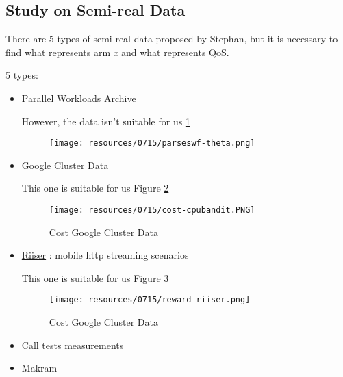 \subsection*{Study on Semi-real Data}
There are 5 types of semi-real data proposed by Stephan, but it is necessary to find what represents arm \textit{x} and what represents QoS.

5 types:
\begin{itemize}
	\item \href{http://www.cs.huji.ac.il/labs/parallel/workload/swf.html}{Parallel Workloads Archive} 
	
	However, the data isn't suitable for us \ref{parseswf-theta}
	\begin{figure}[h]
		\center
		\texttt{[image: resources/0715/parseswf-theta.png]}
		\label{parseswf-theta}
	\end{figure}
		
	\item \href{https://commondatastorage.googleapis.com/clusterdata-2011-2/task_events/}{Google Cluster Data} 
	
	This one is suitable for us Figure \ref{cost-cpubandit} 
	\begin{figure}[h]
		\center
		\texttt{[image: resources/0715/cost-cpubandit.PNG]}
		\caption{Cost Google Cluster Data}
		\label{cost-cpubandit}
	\end{figure}
	
	\item \href{http://home.ifi.uio.no/paalh/dataset/hsdpa-tcp-logs/}{ Riiser} : mobile http streaming scenarios
	
	This one is suitable for us Figure \ref{reward-riiser} 
	\begin{figure}[h]
		\center
		\texttt{[image: resources/0715/reward-riiser.png]}
		\caption{Cost Google Cluster Data}
		\label{reward-riiser}
	\end{figure}
	
	\item Call tests measurements
	\item Makram

\end{itemize}